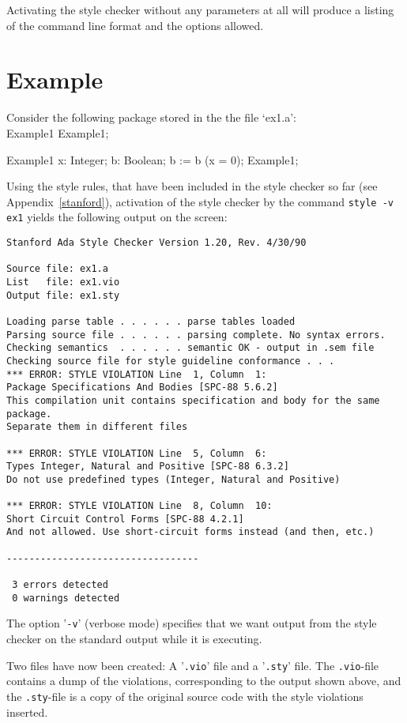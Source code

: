 Activating the style checker without any parameters at all will produce a listing
of the command line format and the options allowed.

\section{Example}

Consider the following package stored in the the file `ex1.a':\\
\apebegin\bhinge
\Package Example1 \Is
\End Example1;

\Package \Body Example1 \Is
  x: Integer;
  b: Boolean;
\Begin
  b := b \And (x = 0);
\End Example1;
\apeend

Using the style rules, that 
have been included in the style checker so far (see Appendix~\ref{stanford}), 
activation of the style checker by the command {\tt style -v ex1}
yields the following output on the screen:

\begin{verbatim}
Stanford Ada Style Checker Version 1.20, Rev. 4/30/90

Source file: ex1.a
List   file: ex1.vio
Output file: ex1.sty

Loading parse table . . . . . . parse tables loaded
Parsing source file . . . . . . parsing complete. No syntax errors.
Checking semantics  . . . . . . semantic OK - output in .sem file
Checking source file for style guideline conformance . . .
*** ERROR: STYLE VIOLATION Line  1, Column  1:
Package Specifications And Bodies [SPC-88 5.6.2]
This compilation unit contains specification and body for the same package.
Separate them in different files

*** ERROR: STYLE VIOLATION Line  5, Column  6:
Types Integer, Natural and Positive [SPC-88 6.3.2]
Do not use predefined types (Integer, Natural and Positive)

*** ERROR: STYLE VIOLATION Line  8, Column  10:
Short Circuit Control Forms [SPC-88 4.2.1]
And not allowed. Use short-circuit forms instead (and then, etc.)

----------------------------------

 3 errors detected
 0 warnings detected
\end{verbatim}

The option '{\tt -v}' (verbose mode) specifies that we want output from
the style checker on the standard output while it is executing.

Two files have now been created: A '{\tt .vio}' file and a '{\tt .sty}'
file. The {\tt .vio}-file contains a dump of the violations, 
corresponding to the output shown above, and the {\tt .sty}-file is a
copy of the original source code with the style violations inserted.

